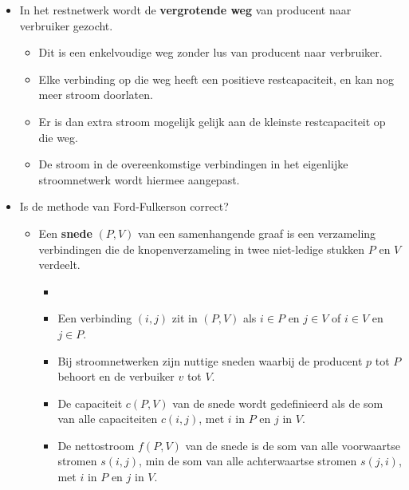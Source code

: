 \begin{itemize}
\begin{itemize}
    \end{itemize}
    \item In het restnetwerk wordt de \textbf{vergrotende weg} van producent naar verbruiker gezocht.
    \begin{itemize}
        \item Dit is een enkelvoudige weg zonder lus van producent naar verbruiker.
        \item Elke verbinding op die weg heeft een positieve restcapaciteit, en kan nog meer stroom doorlaten.
        \item Er is dan extra stroom mogelijk gelijk aan de kleinste restcapaciteit op die weg.
        \item De stroom in de overeenkomstige verbindingen in het eigenlijke stroomnetwerk wordt hiermee aangepast.
    \end{itemize}

    \item Is de methode van Ford-Fulkerson correct?
    \begin{itemize}
        \item Een \textbf{snede} $(P, V)$ van een samenhangende graaf is een verzameling verbindingen die de knopenverzameling in twee niet-ledige stukken $P$ en $V$ verdeelt.
        \begin{itemize}
            \item \item Een verbinding $(i, j)$ zit in $(P, V)$ als $i \in P$ en $j \in V$ of $i \in V$ en $j \in P$. 
            \item Bij stroomnetwerken zijn nuttige sneden waarbij de producent $p$ tot $P$ behoort en de verbuiker $v$ tot $V$.
            \item De capaciteit $c(P, V)$ van de snede wordt gedefinieerd als de som van alle capaciteiten $c(i, j)$, met $i$ in $P$ en $j$ in $V$.
            \item De nettostroom $f(P, V)$ van de snede is de som van alle voorwaartse stromen $s(i, j)$, min de som van alle achterwaartse stromen $s(j, i)$, met $i$ in $P$ en $j$ in $V$.
        \end{itemize}


\end{itemize}
\end{itemize}
